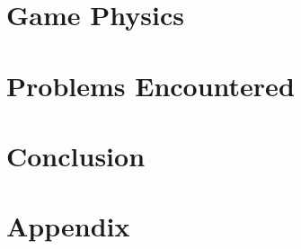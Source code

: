 \documentclass[a4paper,12pt]{article}
\begin{document}
\newpage
\section{Game Physics}
\newpage
\section{Problems Encountered}
\newpage
\section{Conclusion}
\begin{flushleft}

\end{flushleft}
\newpage
\section{Appendix \label{section:appendix}}
\newpage
{}
\begin{flushleft}

\end{flushleft}
\end{document}
